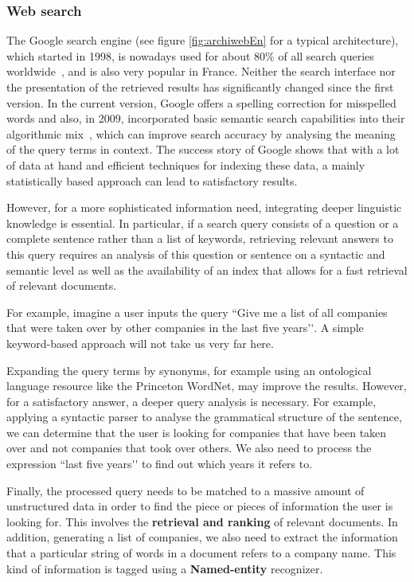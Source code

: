 \begin{multicols}{2}
\subsubsection{Web search}
The Google search engine (see figure \ref{fig:archiwebEn} for a
typical architecture), which started in 1998, is nowadays used for
about 80\% of all search queries worldwide~\cite{googleworld}, and is
also very popular in France. Neither the search interface nor the
presentation of the retrieved results has significantly changed since
the first version. In the current version, Google offers a spelling
correction for misspelled words and also, in 2009, incorporated basic
semantic search capabilities into their algorithmic mix~\cite{googlesemantics}, which can
improve search accuracy by analysing the meaning of the query terms in
context. The success story of Google shows that with a lot of data at
hand and efficient techniques for indexing these data, a mainly
statistically based approach can lead to satisfactory results.

However, for a more sophisticated information need, integrating deeper
linguistic knowledge is essential. In particular, if a search query
consists of a question or a complete sentence rather than a list of
keywords, retrieving relevant answers to this query requires an
analysis of this question or sentence on a syntactic and semantic
level as well as the availability of an index that allows for a fast
retrieval of relevant documents.



For example, imagine a user inputs the query ``Give me a list of all
companies that were taken over by other companies in the last five
years{\mbox '}{\mbox '}. A simple keyword-based approach will not take us very far
here.

Expanding the query terms by synonyms, for example using an
ontological language resource like the Princeton WordNet, may improve
the results. However, for a satisfactory answer, a deeper query
analysis is necessary. For example, applying a syntactic parser to
analyse the grammatical structure of the sentence, we can determine
that the user is looking for companies that have been taken over and
not companies that took over others. We also need to process the
expression ``last five years{\mbox '}{\mbox '} to find out which years it refers to.

Finally, the processed query needs to be matched to a massive amount
of unstructured data in order to find the piece or pieces of
information the user is looking for. This involves the {\bf retrieval and
ranking} of relevant documents. In addition, generating a list of
companies, we also need to extract the information that a particular
string of words in a document refers to a company name. This kind of
information is tagged using a {\bf Named-entity} recognizer.


\end{multicols}
